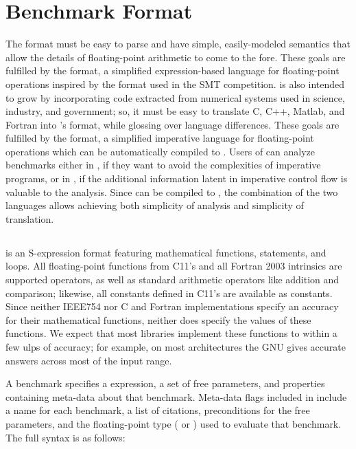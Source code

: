 \documentclass[main.tex]{subfiles}
\begin{document}
\section{Benchmark Format}
\label{sec:format}

The \name format must be easy to parse
  and have simple, easily-modeled semantics
  that allow the details of floating-point arithmetic
  to come to the fore.
These goals are fulfilled by the \core format,
  a simplified expression-based language for floating-point operations
  inspired by the \smtlib format used in the SMT competition.
\name is also intended to grow
  by incorporating code extracted
  from numerical systems used in science, industry, and government;
  so, it must be easy to translate C, C++, Matlab, and Fortran
  into \name's format,
  while glossing over language differences.
These goals are fulfilled by the \surface format,
  a simplified imperative language for floating-point operations
  which can be automatically compiled to \core.
Users of \name can analyze benchmarks either in \core,
  if they want to avoid the complexities of imperative programs,
  or in \surface,
  if the additional information latent in imperative control flow
  is valuable to the analysis.
Since \surface can be compiled to \core,
  the combination of the two languages
  allows achieving both simplicity of analysis
  and simplicity of translation.
  
\subsection{\core}

\core is an S-expression format featuring
  mathematical functions,  statements, and  loops.
All floating-point functions
  from C11's  and all Fortran 2003 intrinsics
  are supported operators,
  as well as standard arithmetic operators like addition and comparison;
  likewise, all constants defined in C11's  are available as constants.
Since neither IEEE754 nor C and Fortran implementations specify
  an accuracy for their mathematical functions,
  neither does \core specify the values of these functions.
We expect that most libraries implement these functions
  to within a few ulps of accuracy;
  for example, on most architectures
  the GNU  gives accurate answers across most of the input range.

A \core benchmark specifies a \core expression,
  a set of free parameters,
  and properties containing meta-data about that benchmark.
Meta-data flags included in \name include a name for each benchmark,
  a list of citations, preconditions for the free parameters,
  and the floating-point type ( or )
  used to evaluate that benchmark.
The full \core syntax is as follows:
\end{document}

